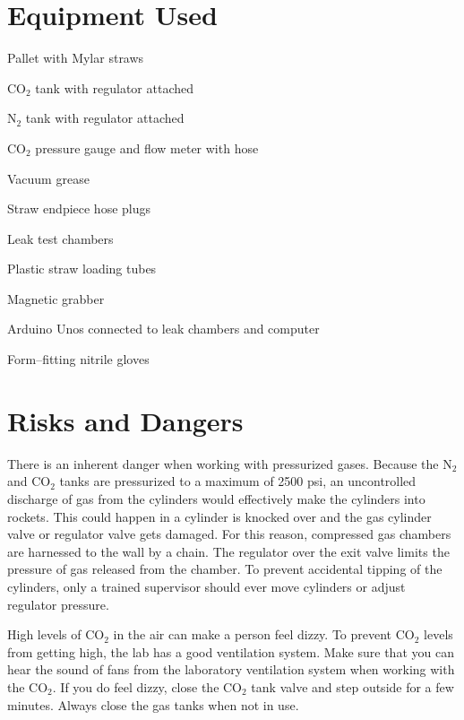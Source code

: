 \documentclass[letterpaper c,12pt]{article}
\begin{document}
\section{Equipment Used}
\begin{multicols}{2}
\begin{myitemize}
	\item Pallet with Mylar straws
	\item CO$_2$ tank with regulator attached
	\item N$_2$ tank with regulator attached
	\item CO$_2$ pressure gauge and flow meter with hose 
	\item Vacuum grease
	\item Straw endpiece hose plugs
	\item Leak test chambers
	\item Plastic straw loading tubes
	\item Magnetic grabber
	\item Arduino Unos connected to leak chambers and computer
	\item Form--fitting nitrile gloves
\end{myitemize}
\end{multicols}


\section{Risks and Dangers}
There is an inherent danger when working with pressurized gases. Because the N$_2$ and CO$_2$ tanks are pressurized to a maximum of 2500 psi, an uncontrolled discharge of gas from the cylinders would effectively make the cylinders into rockets. This could happen in a cylinder is knocked over and the gas cylinder valve or regulator valve gets damaged. For this reason, compressed gas chambers are harnessed to the wall by a chain. The regulator over the exit valve limits the pressure of gas released from the chamber. To prevent accidental tipping of the cylinders, only a trained supervisor should ever move cylinders or adjust regulator pressure. 

High levels of CO$_2$ in the air can make a person feel dizzy. To prevent CO$_2$ levels from getting high, the lab has a good ventilation system. Make sure that you can hear the sound of fans from the laboratory ventilation system when working with the CO$_2$. If you do feel dizzy, close the CO$_2$ tank valve and step outside for a few minutes. Always close the gas tanks when not in use.
\end{document}
